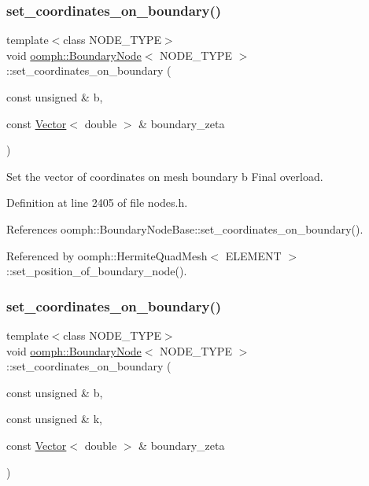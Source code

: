 \subsubsection{\texorpdfstring{set\+\_\+coordinates\+\_\+on\+\_\+boundary()}{set\_coordinates\_on\_boundary()}\hspace{0.1cm}{\footnotesize\ttfamily [1/2]}}
{\footnotesize\ttfamily template$<$class N\+O\+D\+E\+\_\+\+T\+Y\+PE$>$ \\
void \hyperlink{classoomph_1_1BoundaryNode}{oomph\+::\+Boundary\+Node}$<$ N\+O\+D\+E\+\_\+\+T\+Y\+PE $>$\+::set\+\_\+coordinates\+\_\+on\+\_\+boundary (\begin{DoxyParamCaption}\item[{const unsigned \&}]{b,  }\item[{const \hyperlink{classoomph_1_1Vector}{Vector}$<$ double $>$ \&}]{boundary\+\_\+zeta }\end{DoxyParamCaption})\hspace{0.3cm}{\ttfamily [inline]}}



Set the vector of coordinates on mesh boundary b Final overload. 



Definition at line 2405 of file nodes.\+h.



References oomph\+::\+Boundary\+Node\+Base\+::set\+\_\+coordinates\+\_\+on\+\_\+boundary().



Referenced by oomph\+::\+Hermite\+Quad\+Mesh$<$ E\+L\+E\+M\+E\+N\+T $>$\+::set\+\_\+position\+\_\+of\+\_\+boundary\+\_\+node().

\mbox{\label{classoomph_1_1BoundaryNode_ae47b80084ac968d1a7db32917749c56f}} 
\subsubsection{\texorpdfstring{set\+\_\+coordinates\+\_\+on\+\_\+boundary()}{set\_coordinates\_on\_boundary()}\hspace{0.1cm}{\footnotesize\ttfamily [2/2]}}
{\footnotesize\ttfamily template$<$class N\+O\+D\+E\+\_\+\+T\+Y\+PE$>$ \\
void \hyperlink{classoomph_1_1BoundaryNode}{oomph\+::\+Boundary\+Node}$<$ N\+O\+D\+E\+\_\+\+T\+Y\+PE $>$\+::set\+\_\+coordinates\+\_\+on\+\_\+boundary (\begin{DoxyParamCaption}\item[{const unsigned \&}]{b,  }\item[{const unsigned \&}]{k,  }\item[{const \hyperlink{classoomph_1_1Vector}{Vector}$<$ double $>$ \&}]{boundary\+\_\+zeta }\end{DoxyParamCaption})\hspace{0.3cm}{\ttfamily [inline]}}



